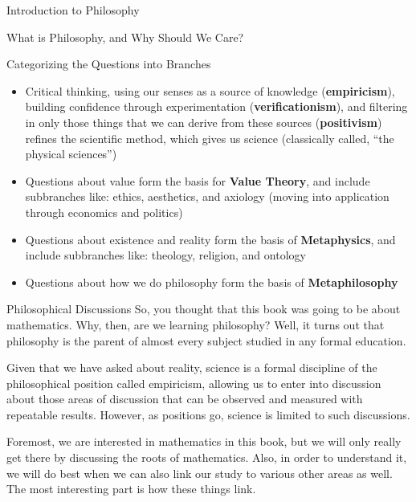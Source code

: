\begin{chapter}{Introduction to Philosophy}
\begin{section}{What is Philosophy, and Why Should We Care?}
\begin{subsection}{Categorizing the Questions into Branches}
\begin{itemize}
                \item Critical thinking, using our senses as a source of knowledge (\textbf{empiricism}), building confidence through experimentation (\textbf{verificationism}), and filtering in only those things that we can derive from these sources (\textbf{positivism}) refines the scientific method, which gives us science (classically called, “the physical sciences”)
                
                \item Questions about value form the basis for \textbf{Value Theory}, and include subbranches like: ethics, aesthetics, and axiology (moving into application through economics and politics)
                    
                \item Questions about existence and reality form the basis of \textbf{Metaphysics}, and include subbranches like: theology, religion, and ontology 
                    
                \item Questions about how we do philosophy form the basis of \textbf{Metaphilosophy}
            \end{itemize}
        \end{subsection}
    \end{section}
    
    \begin{section}{Philosophical Discussions}
        So, you thought that this book was going to be about mathematics. Why, then, are we learning philosophy? Well, it turns out that philosophy is the parent of almost every subject studied in any formal education. 
            
        Given that we have asked about reality, science is a formal discipline of the philosophical position called empiricism, allowing us to enter into discussion about those areas of discussion that can be observed and measured with repeatable results. However, as positions go, science is limited to such discussions.
            
        Foremost, we are interested in mathematics in this book, but we will only really get there by discussing the roots of mathematics. Also, in order to understand it, we will do best when we can also link our study to various other areas as well. The most interesting part is how these things link.
            
        \begin{figure}[ht]
            \centering
\end{figure}
\end{section}
\end{chapter}

